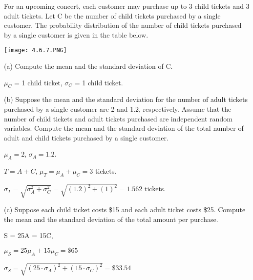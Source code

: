 \documentclass[../stats.tex]{subfiles}
\begin{document}
\begin{example}
    For an upcoming concert, each customer may purchase up to 3 child tickets and 3 adult tickets. Let C be the number of child tickets purchased by a single customer. The probability distribution of the number of child tickets purchased by a single customer is given in the table below.
    \begin{center}
        \texttt{[image: 4.6.7.PNG]}
    \end{center}

    (a) Compute the mean and the standard deviation of C.

    $\mu_C$ = 1 child ticket, $\sigma_C$ = 1 child ticket.

    (b) Suppose the mean and the standard deviation for the number of adult tickets purchased by a single customer are 2 and 1.2, respectively. Assume that the number of child tickets and adult tickets purchased are independent random variables.
    Compute the mean and the standard deviation of the total number of adult and child tickets purchased by a single customer.

    $\mu_A = 2$, $\sigma_A=1.2$. 

    $T=A+C$, $\mu_T=\mu_A+\mu_C=3$ tickets.

    $\sigma_T=\sqrt{\sigma_A^2 + \sigma_C^2}=\sqrt{(1.2)^2+(1)^2}=1.562$ tickets.

    (c) Suppose each child ticket costs \$15 and each adult ticket costs \$25. Compute the mean and the standard deviation of the total amount per purchase.

    S = 25A = 15C, 
    
    $\mu_S = 25\mu_A+15\mu_C = \$65$

    $\sigma_S=\sqrt{(25\cdot\sigma_A)^2+(15\cdot\sigma_C)^2}=\$33.54$
\end{example}
\end{document}
